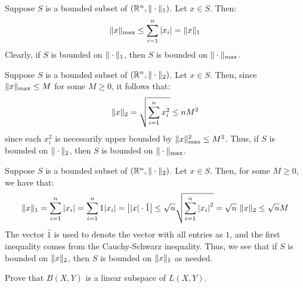 \documentclass{article}
\begin{document}
\newpage
\begin{soln}[title=1 implies Max]
    Suppose $ S $ is a bounded subset of $ (\mathbb{R}^{n}, \|\cdot\|_{1}) $.
    Let $ x \in S $. Then:
    \begin{equation*}
        \|x\|_{\textrm{max}} \leq \sum_{i=1}^{n} {\abs{x_{i}}} = \|x\|_{1}
    \end{equation*}
    Clearly, if $ S $ is bounded on $ \|\cdot\|_{1} $, then
    $ S $ is bounded on $ \|\cdot\|_{\textrm{max}} $.
\end{soln}

\begin{soln}[title=Max implies 2]
    Suppose $ S $ is a bounded subset of $ (\mathbb{R}^{n}, \|\cdot\|_{2}) $.
    Let $ x \in S $. Then, since $ \|x\|_{\textrm{max}} \leq M $ for some $ M \geq 0 $,
    it follows that:
    \begin{equation*}
        \|x\|_{2} = \sqrt{\sum_{i=1}^{n} {x_{i}^{2}} } \leq nM^{2}
    \end{equation*} since each $ x_{i}^{2} $ is necessarily upper bounded by
    $ \|x\|_{\textrm{max}}^{2} \leq M^{2} $.
    Thus, if $ S $ is bounded on $ \|\cdot\|_{2} $, then
    $ S $ is bounded on $ \|\cdot\|_{\textrm{max}} $.
\end{soln}

\begin{soln}[title=2 implies 1]
    Suppose $ S $ is a bounded subset of $ (\mathbb{R}^{n}, \|\cdot\|_{2}) $.
    Let $ x \in S $. Then, for some $ M \geq 0 $, we have that:
    \begin{equation*}
        \|x\|_{1} = \sum_{i=1}^{n} {\abs{x_{i}}} = \sum_{i=1}^{n} {1\abs{x_{i}}}
        = \abs{\abs{x} \cdot \hat{1}} \leq \sqrt{n} \sqrt{\sum_{i=1}^{n} {\abs{x_{i}}^{2}} } 
        = \sqrt{n} \ \|x\|_{2} \leq \sqrt{n} M
    \end{equation*}
    The vector $ \hat{1} $ is used to denote the vector with all entries as $ 1 $,
    and the first inequality comes from the Cauchy-Schwarz inequality. \vsp
    Thus, we see that if $ S $ is bounded on $ \|x\|_{2} $, then $ S $
    is bounded on $ \|x\|_{1} $ as needed.
\end{soln}

\newpage
{}

\begin{qu}
    Prove that $ B(X, Y) $ is a linear subspace of $ L(X, Y) $.
\end{qu}
\end{document}
